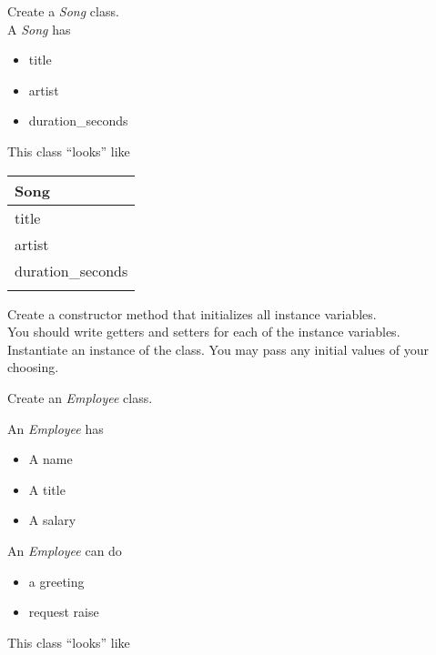 \documentclass{article}
\begin{document}
\begin{enumerate}

	\begin{minipage}{.6\textwidth}
		\item Create a \textit{Song} class.\\
		
		A \textit{Song} has
		\begin{itemize}
			\item title 
			\item artist
			\item duration\_seconds	
		\end{itemize}
	\end{minipage}
	\begin{minipage}{.4\textwidth}
		This class ``looks'' like 
				
		\vspace*{1em}
		\begin{tabular}{|l|}
			\hline Song\\ \hline
			title\\ artist\\ duration\_seconds\\ \hline
			\\  \hline
		\end{tabular}
	\end{minipage}

	\vspace*{2ex}
	Create a constructor method that initializes all instance variables.\\
	You should write getters and setters for each of the instance variables.\\
	Instantiate an instance of the class. You may pass any initial values of your choosing.



	\item Create an \textit{Employee} class.\\
	\begin{minipage}{.6\textwidth}		
		An \textit{Employee} has
		\begin{itemize}
			\item A name
			\item A title
			\item A salary	
		\end{itemize}
	
		An \textit{Employee} can do
		\begin{itemize}
			\item a greeting
			\item request raise
		\end{itemize}
	\end{minipage} 
	\begin{minipage}{.4\textwidth}
		This class ``looks'' like 
				

\end{minipage}
\end{enumerate}
\end{document}
